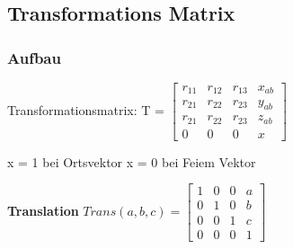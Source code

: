 \clearpage


 \subsection{Transformations Matrix}
 \subsubsection{Aufbau}
 \begin{minipage}{10cm}
     Transformationsmatrix: T = $ 
     \begin{bmatrix} 
     r_{11} & r_{12} & r_{13} & x_{ab} \\
     r_{21} & r_{22} & r_{23} & y_{ab} \\
     r_{21} & r_{22} & r_{23} & z_{ab} \\
     0 & 0 & 0 & x                              
     \end{bmatrix}$
     
     x = 1 bei Ortsvektor \hspace{1cm} x = 0 bei Feiem Vektor
     
 \end{minipage}
 \begin{minipage}{0.33\linewidth}
     \textbf{Translation}\newline
     $Trans(a,b,c)=\begin{bmatrix}
     1 & 0 & 0 & a \\ 
     0 & 1 & 0 & b \\ 
     0 & 0 & 1 & c \\ 
     0 & 0 & 0 &  1
     \end{bmatrix}$
 \end{minipage}
 
